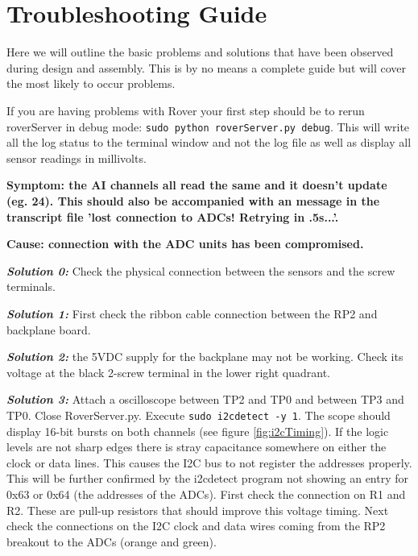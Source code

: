 \documentclass{article}
\begin{document}
\section{Troubleshooting Guide}
Here we will outline the basic problems and solutions that have been observed during design and assembly. This is by no means a complete guide but will cover the most likely to occur problems.
\newline
\newline

If you are having problems with Rover your first step should be to rerun roverServer in debug mode: \texttt{sudo python roverServer.py debug}. This will write all the log status to the terminal window and not the log file as well as display all sensor readings in millivolts.
\newline
\newline


\noindent
\textbf{Symptom: the AI channels all read the same and it doesn't update (eg. 24). This should also be accompanied with an message in the transcript file 'lost connection to ADCs! Retrying in .5s...'.}

\noindent
\textbf{Cause: connection with the ADC units has been compromised.}

\noindent
\textbf{\emph{Solution 0:}} Check the physical connection between the sensors and the screw terminals.

\noindent
\textbf{\emph{Solution 1:}} First check the ribbon cable connection between the RP2 and backplane board.

\noindent
\textbf{\emph{Solution 2:}} the 5VDC supply for the backplane may not be working. Check its voltage at the black 2-screw terminal in the lower right quadrant.

\noindent
\textbf{\emph{Solution 3:}} Attach a oscilloscope between TP2 and TP0 and between TP3 and TP0. Close RoverServer.py. Execute \texttt{sudo i2cdetect -y 1}. The scope should display 16-bit bursts on both channels (see figure \ref{fig:i2cTiming}). If the logic levels are not sharp edges there is stray capacitance somewhere on either the clock or data lines. This causes the I2C bus to not register the addresses properly. This will be further confirmed by the i2cdetect program not showing an entry for 0x63 or 0x64 (the addresses of the ADCs). First check the connection on R1 and R2. These are pull-up resistors that should improve this voltage timing. Next check the connections on the I2C clock and data wires coming from the RP2 breakout to the ADCs (orange and green).
\newline
\newline
\end{document}
